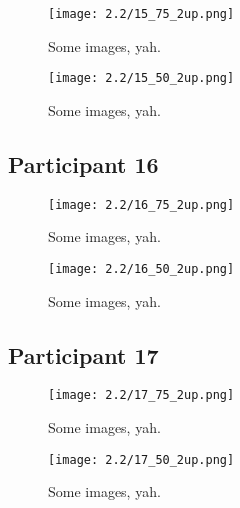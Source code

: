 \begin{figure}[h]
	\begin{center}
	\texttt{[image: 2.2/15\_75\_2up.png]}
	\caption{Some images, yah.}
	\end{center}
\end{figure}

\clearpage

\begin{figure}[h]
	\begin{center}
	\texttt{[image: 2.2/15\_50\_2up.png]}
	\caption{Some images, yah.}
	\end{center}
\end{figure}


\clearpage

\subsection{Participant 16}

\begin{figure}[h]
	\begin{center}
	\texttt{[image: 2.2/16\_75\_2up.png]}
	\caption{Some images, yah.}
	\end{center}
\end{figure}

\clearpage

\begin{figure}[h]
	\begin{center}
	\texttt{[image: 2.2/16\_50\_2up.png]}
	\caption{Some images, yah.}
	\end{center}
\end{figure}


\clearpage

\subsection{Participant 17}

\begin{figure}[h]
	\begin{center}
	\texttt{[image: 2.2/17\_75\_2up.png]}
	\caption{Some images, yah.}
	\end{center}
\end{figure}

\clearpage

\begin{figure}[h]
	\begin{center}
	\texttt{[image: 2.2/17\_50\_2up.png]}
	\caption{Some images, yah.}
	\end{center}
\end{figure}

